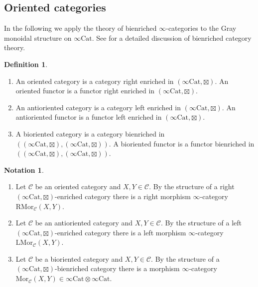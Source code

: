 \documentclass[10pt,oneside]{article}
\numberwithin{equation}{section} %
\numberwithin{figure}{section} %
\theoremstyle{plain}
\theoremstyle{definition}
\newtheorem{definition}[theorem]{Definition}
\newtheorem{notation}[theorem]{Notation}
\newcommand{\mC}{{\mathcal C}}
\renewcommand{\L}{{\mathrm L}}
\newcommand{\R}{{\mathrm R}}
\newcommand{\X}{X}
\newcommand{\Y}{Y}
\newcommand{\Cat}{\mathrm{Cat}}
\newcommand{\Mor}{{\mathrm{Mor}}}
\begin{document}
\subsection{Oriented categories}



In the following we apply the theory of bienriched $\infty$-categories to the Gray monoidal structure on $\infty\Cat$.
See \cite{heine2024bienriched} for a detailed discussion of bienriched category theory.



\begin{definition}
\begin{enumerate}[\normalfont(1)]\setlength{\itemsep}{-2pt}
\item An oriented category is a category right enriched in $(\infty\Cat,\boxtimes).$
An oriented functor is a functor right enriched in $(\infty\Cat,\boxtimes).$

\item An antioriented category is a category left enriched in $(\infty\Cat,\boxtimes).$
An antioriented functor is a functor left enriched in $(\infty\Cat,\boxtimes).$

\item A bioriented category is a category bienriched in  $((\infty\Cat,\boxtimes), (\infty\Cat,\boxtimes))$.
A bioriented functor is a functor bienriched in  $((\infty\Cat,\boxtimes), (\infty\Cat,\boxtimes))$.

\end{enumerate}

\end{definition}



\begin{notation}
\begin{enumerate}[\normalfont(1)]\setlength{\itemsep}{-2pt}
\item Let $\mC$ be an oriented category and $\X,\Y \in \mC.$	
By the structure of a right $(\infty\Cat,\boxtimes)$-enriched category there is a right morphism $\infty$-category $\R\Mor_\mC(\X,\Y)$.

\item Let $\mC$ be an antioriented category and $\X,\Y \in \mC.$	
By the structure of a left $(\infty\Cat,\boxtimes)$-enriched category there
is a left morphism $\infty$-category $\L\Mor_\mC(\X,\Y)$.

\item Let $\mC$ be a bioriented category and $\X,\Y \in \mC.$	
By the structure of a $(\infty\Cat,\boxtimes)$-bienriched category there
is a morphism $\infty$-category $\Mor_\mC(\X,\Y) \in \infty\Cat \otimes \infty\Cat.$

\end{enumerate}
	
\end{notation}
\end{document}

